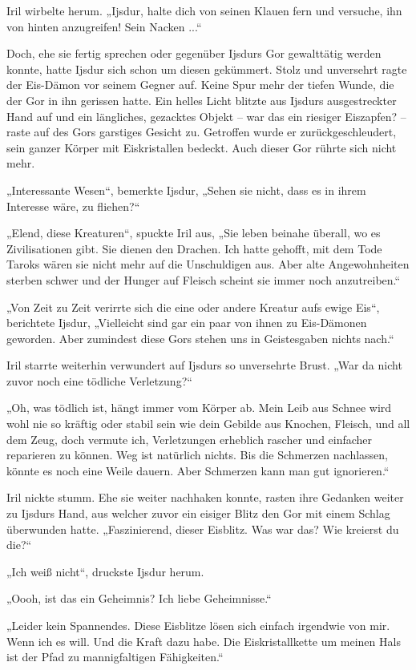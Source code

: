 Iril wirbelte herum. „Ijsdur, halte dich von seinen Klauen fern und versuche, ihn von hinten anzugreifen! Sein Nacken ...“

Doch, ehe sie fertig sprechen oder gegenüber Ijsdurs Gor gewalttätig werden konnte, hatte Ijsdur sich schon um diesen gekümmert. Stolz und unversehrt ragte der Eis-Dämon vor seinem Gegner auf. Keine Spur mehr der tiefen Wunde, die der Gor in ihn gerissen hatte. Ein helles Licht blitzte aus Ijsdurs ausgestreckter Hand auf und ein längliches, gezacktes Objekt – war das ein riesiger Eiszapfen? – raste auf des Gors garstiges Gesicht zu. Getroffen wurde er zurückgeschleudert, sein ganzer Körper mit Eiskristallen bedeckt. Auch dieser Gor rührte sich nicht mehr.

„Interessante Wesen“, bemerkte Ijsdur, „Sehen sie nicht, dass es in ihrem Interesse wäre, zu fliehen?“

„Elend, diese Kreaturen“, spuckte Iril aus, „Sie leben beinahe überall, wo es Zivilisationen gibt. Sie dienen den Drachen. Ich hatte gehofft, mit dem Tode Taroks wären sie nicht mehr auf die Unschuldigen aus. Aber alte Angewohnheiten sterben schwer und der Hunger auf Fleisch scheint sie immer noch anzutreiben.“

„Von Zeit zu Zeit verirrte sich die eine oder andere Kreatur aufs ewige Eis“, berichtete Ijsdur, „Vielleicht sind gar ein paar von ihnen zu Eis-Dämonen geworden. Aber zumindest diese Gors stehen uns in Geistesgaben nichts nach.“

Iril starrte weiterhin verwundert auf Ijsdurs so unversehrte Brust. „War da nicht zuvor noch eine tödliche Verletzung?“

„Oh, was tödlich ist, hängt immer vom Körper ab. Mein Leib aus Schnee wird wohl nie so kräftig oder stabil sein wie dein Gebilde aus Knochen, Fleisch, und all dem Zeug, doch vermute ich, Verletzungen erheblich rascher und einfacher reparieren zu können. Weg ist natürlich nichts. Bis die Schmerzen nachlassen, könnte es noch eine Weile dauern. Aber Schmerzen kann man gut ignorieren.“

Iril nickte stumm. Ehe sie weiter nachhaken konnte, rasten ihre Gedanken weiter zu Ijsdurs Hand, aus welcher zuvor ein eisiger Blitz den Gor mit einem Schlag überwunden hatte. „Faszinierend, dieser Eisblitz. Was war das? Wie kreierst du die?“

„Ich weiß nicht“, druckste Ijsdur herum.

„Oooh, ist das ein Geheimnis? Ich liebe Geheimnisse.“

„Leider kein Spannendes. Diese Eisblitze lösen sich einfach irgendwie von mir. Wenn ich es will. Und die Kraft dazu habe. Die Eiskristallkette um meinen Hals ist der Pfad zu mannigfaltigen Fähigkeiten.“

